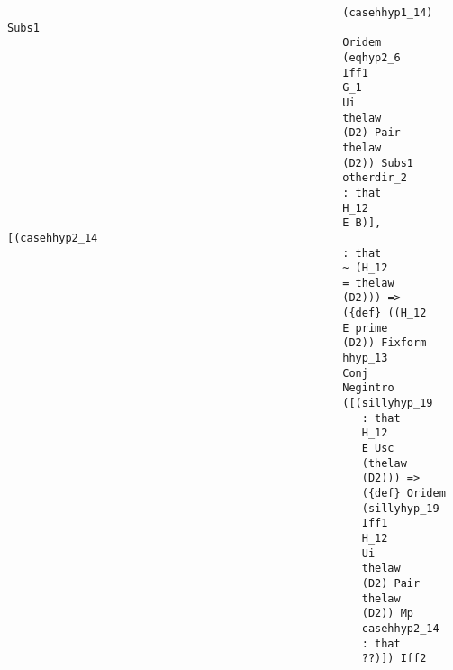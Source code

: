 \documentclass[12pt]{article}
\begin{document}
\begin{verbatim}
                                                    (casehhyp1_14) Subs1 
                                                    Oridem 
                                                    (eqhyp2_6 
                                                    Iff1 
                                                    G_1 
                                                    Ui 
                                                    thelaw 
                                                    (D2) Pair 
                                                    thelaw 
                                                    (D2)) Subs1 
                                                    otherdir_2 
                                                    : that 
                                                    H_12 
                                                    E B)], [(casehhyp2_14 
                                                    : that 
                                                    ~ (H_12 
                                                    = thelaw 
                                                    (D2))) => 
                                                    ({def} ((H_12 
                                                    E prime 
                                                    (D2)) Fixform 
                                                    hhyp_13 
                                                    Conj 
                                                    Negintro 
                                                    ([(sillyhyp_19 
                                                       : that 
                                                       H_12 
                                                       E Usc 
                                                       (thelaw 
                                                       (D2))) => 
                                                       ({def} Oridem 
                                                       (sillyhyp_19 
                                                       Iff1 
                                                       H_12 
                                                       Ui 
                                                       thelaw 
                                                       (D2) Pair 
                                                       thelaw 
                                                       (D2)) Mp 
                                                       casehhyp2_14 
                                                       : that 
                                                       ??)]) Iff2 

\end{verbatim}
\end{document}
